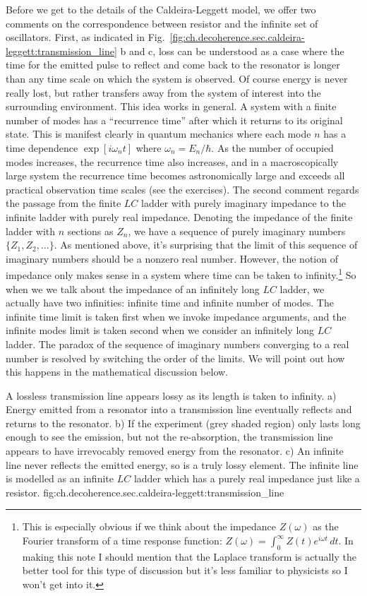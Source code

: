 Before we get to the details of the Caldeira-Leggett model, we offer two comments on the correspondence between resistor and the infinite set of oscillators.
First, as indicated in Fig.~\ref{fig:ch.decoherence.sec.caldeira-leggett:transmission_line} b and c, loss can be understood as a case where the time for the emitted pulse to reflect and come back to the resonator is longer than any time scale on which the system is observed.
Of course energy is never really lost, but rather transfers away from the system of interest into the surrounding environment.
This idea works in general.
A system with a finite number of modes has a ``recurrence time'' after which it returns to its original state.
This is manifest clearly in quantum mechanics where each mode $n$ has a time dependence $\exp [ i \omega_n t]$ where $\omega_n = E_n/\hbar$.
As the number of occupied modes increases, the recurrence time also increases, and in a macroscopically large system the recurrence time becomes astronomically large and exceeds all practical observation time scales (see the exercises).
The second comment regards the passage from the finite $LC$ ladder with purely imaginary impedance to the infinite ladder with purely real impedance.
Denoting the impedance of the finite ladder with $n$ sections as $Z_n$, we have a sequence of purely imaginary numbers $\{ Z_1, Z_2, \ldots \}$.
As mentioned above, it's surprising that the limit of this sequence of imaginary numbers should be a nonzero real number.
However, the notion of impedance only makes sense in a system where time can be taken to infinity.\footnote{This is especially obvious if we think about the impedance $Z(\omega)$ as the Fourier transform of a time response function: $Z(\omega) = \int_0^\infty Z(t) e^{i \omega t} \, dt$. In making this note I should mention that the Laplace transform is actually the better tool for this type of discussion but it's less familiar to physicists so I won't get into it.}
So when we we talk about the impedance of an infinitely long $LC$ ladder, we actually have two infinities: infinite time and infinite number of modes.
The infinite time limit is taken first when we invoke impedance arguments, and the infinite modes limit is taken second when we consider an infinitely long $LC$ ladder.
The paradox of the sequence of imaginary numbers converging to a real number is resolved by switching the order of the limits.
We will point out how this happens in the mathematical discussion below.

{A lossless transmission line appears lossy as its length is taken to infinity.
a) Energy emitted from a resonator into a transmission line eventually reflects and returns to the resonator.
b) If the experiment (grey shaded region) only lasts long enough to see the emission, but not the re-absorption, the transmission line appears to have irrevocably removed energy from the resonator.
c) An infinite line never reflects the emitted energy, so is a truly lossy element.
The infinite line is modelled as an infinite $LC$ ladder which has a purely real impedance just like a resistor.
}
{fig:ch.decoherence.sec.caldeira-leggett:transmission_line}


